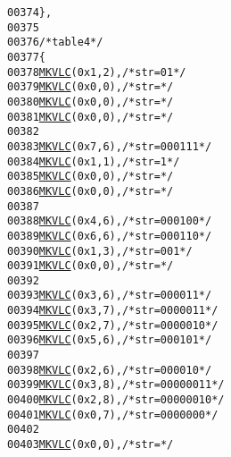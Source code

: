\begin{footnotesize}
\begin{alltt}
00374     \},
00375 
00376     \textcolor{comment}{/* table 4 */}
00377     \{
00378         \hyperlink{vlc_8h_aa680b26539d09b5954221ff39a127faa}{MKVLC}( 0x1, 2 ), \textcolor{comment}{/* str=01 */}
00379         \hyperlink{vlc_8h_aa680b26539d09b5954221ff39a127faa}{MKVLC}( 0x0, 0 ), \textcolor{comment}{/* str= */}
00380         \hyperlink{vlc_8h_aa680b26539d09b5954221ff39a127faa}{MKVLC}( 0x0, 0 ), \textcolor{comment}{/* str= */}
00381         \hyperlink{vlc_8h_aa680b26539d09b5954221ff39a127faa}{MKVLC}( 0x0, 0 ), \textcolor{comment}{/* str= */}
00382 
00383         \hyperlink{vlc_8h_aa680b26539d09b5954221ff39a127faa}{MKVLC}( 0x7, 6 ), \textcolor{comment}{/* str=000111 */}
00384         \hyperlink{vlc_8h_aa680b26539d09b5954221ff39a127faa}{MKVLC}( 0x1, 1 ), \textcolor{comment}{/* str=1 */}
00385         \hyperlink{vlc_8h_aa680b26539d09b5954221ff39a127faa}{MKVLC}( 0x0, 0 ), \textcolor{comment}{/* str= */}
00386         \hyperlink{vlc_8h_aa680b26539d09b5954221ff39a127faa}{MKVLC}( 0x0, 0 ), \textcolor{comment}{/* str= */}
00387 
00388         \hyperlink{vlc_8h_aa680b26539d09b5954221ff39a127faa}{MKVLC}( 0x4, 6 ), \textcolor{comment}{/* str=000100 */}
00389         \hyperlink{vlc_8h_aa680b26539d09b5954221ff39a127faa}{MKVLC}( 0x6, 6 ), \textcolor{comment}{/* str=000110 */}
00390         \hyperlink{vlc_8h_aa680b26539d09b5954221ff39a127faa}{MKVLC}( 0x1, 3 ), \textcolor{comment}{/* str=001 */}
00391         \hyperlink{vlc_8h_aa680b26539d09b5954221ff39a127faa}{MKVLC}( 0x0, 0 ), \textcolor{comment}{/* str= */}
00392 
00393         \hyperlink{vlc_8h_aa680b26539d09b5954221ff39a127faa}{MKVLC}( 0x3, 6 ), \textcolor{comment}{/* str=000011 */}
00394         \hyperlink{vlc_8h_aa680b26539d09b5954221ff39a127faa}{MKVLC}( 0x3, 7 ), \textcolor{comment}{/* str=0000011 */}
00395         \hyperlink{vlc_8h_aa680b26539d09b5954221ff39a127faa}{MKVLC}( 0x2, 7 ), \textcolor{comment}{/* str=0000010 */}
00396         \hyperlink{vlc_8h_aa680b26539d09b5954221ff39a127faa}{MKVLC}( 0x5, 6 ), \textcolor{comment}{/* str=000101 */}
00397 
00398         \hyperlink{vlc_8h_aa680b26539d09b5954221ff39a127faa}{MKVLC}( 0x2, 6 ), \textcolor{comment}{/* str=000010 */}
00399         \hyperlink{vlc_8h_aa680b26539d09b5954221ff39a127faa}{MKVLC}( 0x3, 8 ), \textcolor{comment}{/* str=00000011 */}
00400         \hyperlink{vlc_8h_aa680b26539d09b5954221ff39a127faa}{MKVLC}( 0x2, 8 ), \textcolor{comment}{/* str=00000010 */}
00401         \hyperlink{vlc_8h_aa680b26539d09b5954221ff39a127faa}{MKVLC}( 0x0, 7 ), \textcolor{comment}{/* str=0000000 */}
00402 
00403         \hyperlink{vlc_8h_aa680b26539d09b5954221ff39a127faa}{MKVLC}( 0x0, 0 ), \textcolor{comment}{/* str= */}

\end{alltt}
\end{footnotesize}
